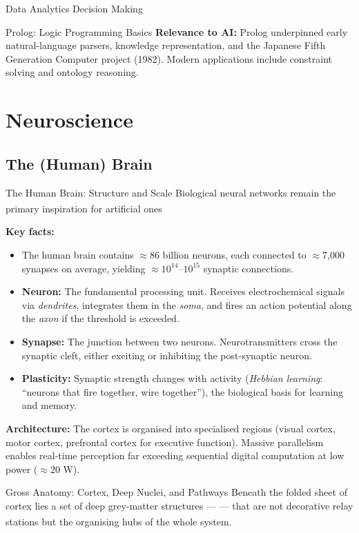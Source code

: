 \begin{v3topic}{Data Analytics Decision Making}
\begin{v3topic}{Prolog: Logic Programming Basics}
        \textbf{Relevance to AI:} Prolog underpinned early natural-language parsers, knowledge representation, and the Japanese Fifth Generation Computer project (1982). Modern applications include constraint solving and ontology reasoning.
\end{v3topic}

    \section{Neuroscience}
    \subsection{The (Human) Brain}

\begin{v3topic}{The Human Brain: Structure and Scale}
        Biological neural networks remain the primary inspiration for artificial ones\textsuperscript{\cite[][p.~13]{Kriesel2007NeuralNetworks}}

        \textbf{Key facts:}
        \begin{itemize}
            \item The human brain contains $\approx$86 billion neurons, each connected to $\approx$7{,}000 synapses on average, yielding $\approx 10^{14}$--$10^{15}$ synaptic connections.
            \item \textbf{Neuron:} The fundamental processing unit. Receives electrochemical signals via \emph{dendrites}, integrates them in the \emph{soma}, and fires an action potential along the \emph{axon} if the threshold is exceeded.
            \item \textbf{Synapse:} The junction between two neurons. Neurotransmitters cross the synaptic cleft, either exciting or inhibiting the post-synaptic neuron.
            \item \textbf{Plasticity:} Synaptic strength changes with activity (\emph{Hebbian learning}: ``neurons that fire together, wire together''), the biological basis for learning and memory.
        \end{itemize}

        \textbf{Architecture:} The cortex is organised into specialised regions (visual cortex, motor cortex, prefrontal cortex for executive function). Massive parallelism enables real-time perception far exceeding sequential digital computation at low power ($\approx$20 W).
\end{v3topic}

\begin{v3topic}{Gross Anatomy: Cortex, Deep Nuclei, and Pathways}
        Beneath the folded sheet of cortex lies a set of deep grey-matter
        structures ---  --- that are not decorative relay
        stations but the organising hubs of the whole
        system\textsuperscript{\cite[][chs.~1--3]{purvesNeuroscience2018}}.


\end{v3topic}
\end{v3topic}
